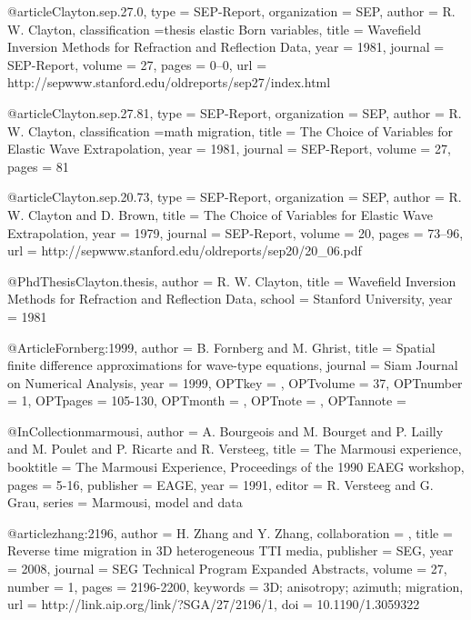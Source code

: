{@article{Clayton.sep.27.0,
  type =	 {SEP-Report},
  organization = {SEP},
  author =	 {R. W. Clayton},
  classification ={thesis elastic {Born} variables},
  title =	 {Wavefield Inversion Methods for Refraction and
                  Reflection Data},
  year =	 1981,
  journal =	 {SEP-Report},
  volume =	 27,
  pages =	 {0--0},
  url =
                  {http://sepwww.stanford.edu/oldreports/sep27/index.html}
}

@article{Clayton.sep.27.81,
  type =	 {SEP-Report},
  organization = {SEP},
  author =	 {R. W. Clayton},
  classification ={math migration},
  title =	 {The Choice of Variables for Elastic Wave
                  Extrapolation},
  year =	 1981,
  journal =	 {SEP-Report},
  volume =	 27,
  pages =	 81
}

@article{Clayton.sep.20.73,
  type =	 {SEP-Report},
  organization = {SEP},
  author =	 {R. W. Clayton and D. Brown},
  title =	 {The Choice of Variables for Elastic Wave
                  Extrapolation},
  year =	 1979,
  journal =	 {SEP-Report},
  volume =	 20,
  pages =	 {73--96},
  url =
                  {http://sepwww.stanford.edu/oldreports/sep20/20_06.pdf}
}

@PhdThesis{Clayton.thesis,
  author =	 {R. W. Clayton},
  title =	 {Wavefield Inversion Methods for Refraction and
                  Reflection Data},
  school =	 {Stanford University},
  year =	 1981
}

@Article{Fornberg:1999,
  author = 	 {B. Fornberg and M. Ghrist},
  title = 	 {Spatial finite difference approximations for
                  wave-type equations},
  journal = 	 {Siam Journal on Numerical Analysis},
  year = 	 {1999},
  OPTkey = 	 {},
  OPTvolume = 	 {37},
  OPTnumber = 	 {1},
  OPTpages = 	 {105-130},
  OPTmonth = 	 {},
  OPTnote = 	 {},
  OPTannote = 	 {}
}

@InCollection{marmousi,
  author =	 {A. Bourgeois and M. Bourget and P. Lailly and
                  M. Poulet and P. Ricarte and R. Versteeg},
  title =	 {The {M}armousi experience},
  booktitle =	 {The Marmousi Experience, Proceedings of the 1990
                  EAEG workshop},
  pages =	 {5-16},
  publisher =    {EAGE},
  year =	 1991,
  editor =	 {R. Versteeg and G. Grau},
  series =	 {Marmousi, model and data}
}

@article{zhang:2196,
author = {H. Zhang and Y. Zhang},
collaboration = {},
title = {Reverse time migration in 3{D} heterogeneous {TTI} media},
publisher = {SEG},
year = {2008},
journal = {SEG Technical Program Expanded Abstracts},
volume = {27},
number = {1},
pages = {2196-2200},
keywords = {3D; anisotropy; azimuth; migration},
url = {http://link.aip.org/link/?SGA/27/2196/1},
doi = {10.1190/1.3059322}
}

}
